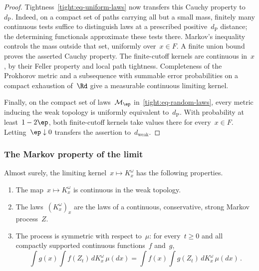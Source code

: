 \documentclass[11pt]{amsart}
\begin{document}
\begin{proof}
\smallskip

Tightness~\eqref{tight:eq-uniform-laws} now transfers this Cauchy property to~$d_{\mathrm P}$. Indeed, on a compact set of paths carrying all but a small mass, finitely many continuous tests suffice to distinguish laws at a prescribed positive~$d_{\mathrm P}$ distance; the determining functionals approximate these tests there. Markov's inequality controls the mass outside that set, uniformly over~$x\in F$. A finite union bound proves the asserted Cauchy property. The finite-cutoff kernels are continuous in~$x$, by their Feller property and local path tightness. Completeness of the Prokhorov metric and a subsequence with summable error probabilities on a compact exhaustion of~$\Rd$ give a measurable continuous limiting kernel.

\smallskip

Finally, on the compact set of laws~$\mathcal M_\ep$ in~\eqref{tight:eq-random-laws}, every metric inducing the weak topology is uniformly equivalent to~$d_{\mathrm P}$. With probability at least~$1-2\ep$, both finite-cutoff kernels take values there for every~$x\in F$. Letting~$\ep\downarrow0$ transfers the assertion to~$d_{\mathrm{weak}}$.
\end{proof}

\subsubsection{The Markov property of the limit}

\begin{proposition}
\label{mfd:prop-limit-properties}
Almost surely, the limiting kernel~$x\mapsto K^\omega_x$ has the following properties.
\begin{enumerate}[label=(\roman*),leftmargin=*]
\item The map~$x\mapsto K^\omega_x$ is continuous in the weak topology.
\item The laws~$(K^\omega_x)_x$ are the laws of a continuous, conservative, strong Markov process~$Z$.
\item The process is symmetric with respect to~$\mu$: for every~$t\geq0$ and all compactly supported continuous functions~$f$ and~$g$,
\begin{equation*}
	\int g(x)\int f(Z_t)\,dK^\omega_x\,\mu(dx)=\int f(x)\int g(Z_t)\,dK^\omega_x\,\mu(dx)\,.
\end{equation*}
\end{enumerate}
\end{proposition}
\end{document}
